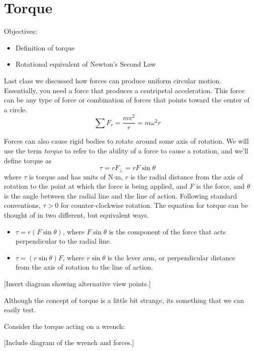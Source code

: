 \section{Torque}
Objectives:
\begin{itemize}
\item Definition of torque
\item Rotational equivalent of Newton's Second Law
\end{itemize}

\hrulefill

Last class we discussed how forces can produce uniform circular motion. Essentially, you need a force that produces a centripetal acceleration. This force can be any type of force or combination of forces that points toward the center of a circle.
$$\sum F_r=\frac{mv^2}{r}=m\omega^2r$$

Forces can also cause rigid bodies to rotate around some axis of rotation. We will use the term \textit{torque} to refer to the ability of a force to cause a rotation, and we'll define torque as 
$$\boxed{\tau=rF_\perp=rF\sin\theta}$$
where $\tau$ is torque and has units of N$\cdot$m, $r$ is the radial distance from the axis of rotation to the point at which the force is being applied, and $F$ is the force, and $\theta$ is the angle between the radial line and the line of action. Following standard conventions, $\tau>0$ for counter-clockwise rotation. The equation for torque can be thought of in two different, but equivalent ways.

\begin{itemize}
\item $\tau=r(F\sin\theta)$, where $F\sin\theta$ is the component of the force that acts perpendicular to the radial line.
\item $\tau=(r\sin\theta)F$, where $r\sin\theta$ is the lever arm, or perpendicular distance from the axis of rotation to the line of action.
\end{itemize}

[Insert diagram showing alternative view points.]
\vspace{5cm}


Although the concept of torque is a little bit strange, its something that we can easily test.

\vspace{3cm}



Consider the torque acting on a wrench: 

[Include diagram of the wrench and forces.]
\vspace{5cm}


